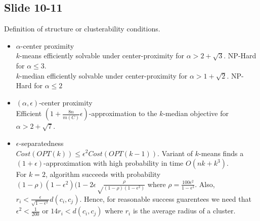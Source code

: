 \documentclass[12pt]{article}
\begin{document}
\subsection*{Slide 10-11}
Definition of structure or clusterability conditions.
	\begin{itemize}
		\item $\alpha$-center proximity\\
		$k$-means efficiently solvable under center-proximity for $\alpha > 2 + \sqrt{3}$. NP-Hard for $\alpha \le 3$.\\
		 $k$-median efficiently solvable under center-proximity for $\alpha > 1 + \sqrt{2}$. NP-Hard for $\alpha \le 2$
		 
		 \item $(\alpha, \epsilon)$-center proximity\\
		 Efficient $(1+\frac{8n}{m(C)}\epsilon)$-approximation to the $k$-median objective for $\alpha > 2 + \sqrt{7}$.
		 
		 \item $\epsilon$-separatedness\\
		 $Cost(OPT(k)) \le \epsilon^2 Cost(OPT(k-1))$. Variant of $k$-means finds a $(1+\epsilon)$-approximation with high probability in time $O(nk+k^3)$. \\
		 For $k=2$, algorithm succeeds with probability $(1-\rho)(1-\epsilon^2)(1-2\epsilon\sqrt\frac{\rho}{(1-\rho)(1-\epsilon^2)}$ where $\rho = \frac{100\epsilon^2}{1-\epsilon^2}$. Also, $r_i < \frac{\epsilon}{\sqrt{1-\epsilon^2}} d(c_i, c_j)$.  Hence, for reasonable success guarentees we need that $\epsilon^2 < \frac{1}{200}$ or $14 r_i < d(c_i, c_j)$ where $r_i$ is the average radius of a cluster.
	\end{itemize}
\end{document}

